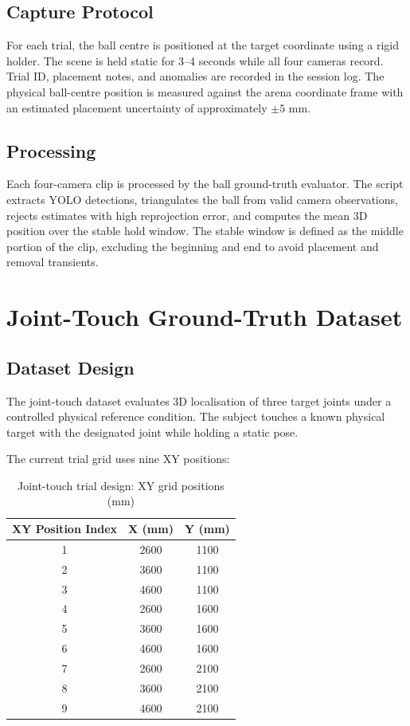\subsection{Capture Protocol}

For each trial, the ball centre is positioned at the target coordinate using a rigid holder. The scene is held static for 3--4 seconds while all four cameras record. Trial ID, placement notes, and anomalies are recorded in the session log. The physical ball-centre position is measured against the arena coordinate frame with an estimated placement uncertainty of approximately $\pm 5$ mm.

\subsection{Processing}

Each four-camera clip is processed by the ball ground-truth evaluator. The script extracts YOLO detections, triangulates the ball from valid camera observations, rejects estimates with high reprojection error, and computes the mean 3D position over the stable hold window. The stable window is defined as the middle portion of the clip, excluding the beginning and end to avoid placement and removal transients.

\section{Joint-Touch Ground-Truth Dataset}

\subsection{Dataset Design}

The joint-touch dataset evaluates 3D localisation of three target joints under a controlled physical reference condition. The subject touches a known physical target with the designated joint while holding a static pose.

The current trial grid uses nine XY positions:

\begin{table}[h]
\centering
\caption{Joint-touch trial design: XY grid positions (mm)}
\label{table:4_2_joint_touch_xy}
\begin{tabular}{|c|c|c|}
\hline
\textbf{XY Position Index} & \textbf{X (mm)} & \textbf{Y (mm)} \\
\hline
1 & 2600 & 1100 \\
\hline
2 & 3600 & 1100 \\
\hline
3 & 4600 & 1100 \\
\hline
4 & 2600 & 1600 \\
\hline
5 & 3600 & 1600 \\
\hline
6 & 4600 & 1600 \\
\hline
7 & 2600 & 2100 \\
\hline
8 & 3600 & 2100 \\
\hline
9 & 4600 & 2100 \\
\hline
\end{tabular}
\end{table}


